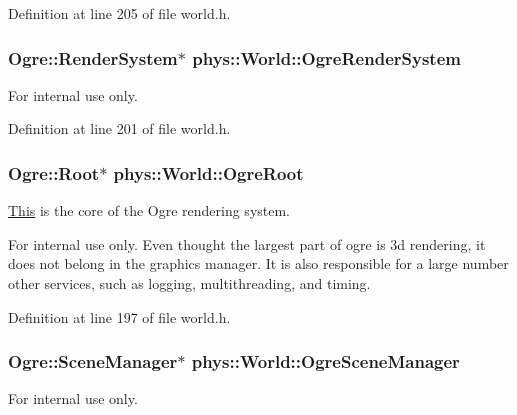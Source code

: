 Definition at line 205 of file world.h.

\hypertarget{classphys_1_1World_a2886c543dbb9e102d83c660175f59cd0}{
\subsubsection[{OgreRenderSystem}]{\setlength{\rightskip}{0pt plus 5cm}Ogre::RenderSystem$\ast$ {\bf phys::World::OgreRenderSystem}}}
\label{da/ddf/classphys_1_1World_a2886c543dbb9e102d83c660175f59cd0}
\begin{DoxyInternal}{For internal use only.}
\end{DoxyInternal}


Definition at line 201 of file world.h.

\hypertarget{classphys_1_1World_a07bd53ea67c1a956004a007f99f7fc5b}{
\subsubsection[{OgreRoot}]{\setlength{\rightskip}{0pt plus 5cm}Ogre::Root$\ast$ {\bf phys::World::OgreRoot}}}
\label{da/ddf/classphys_1_1World_a07bd53ea67c1a956004a007f99f7fc5b}


\hyperlink{structThis}{This} is the core of the Ogre rendering system. 

\begin{DoxyInternal}{For internal use only.}
Even thought the largest part of ogre is 3d rendering, it does not belong in the graphics manager. It is also responsible for a large number other services, such as logging, multithreading, and timing. \end{DoxyInternal}


Definition at line 197 of file world.h.

\hypertarget{classphys_1_1World_ad90c8938abf8d159722ad5dfacb18cea}{
\subsubsection[{OgreSceneManager}]{\setlength{\rightskip}{0pt plus 5cm}Ogre::SceneManager$\ast$ {\bf phys::World::OgreSceneManager}}}
\label{da/ddf/classphys_1_1World_ad90c8938abf8d159722ad5dfacb18cea}
\begin{DoxyInternal}{For internal use only.}
\end{DoxyInternal}


